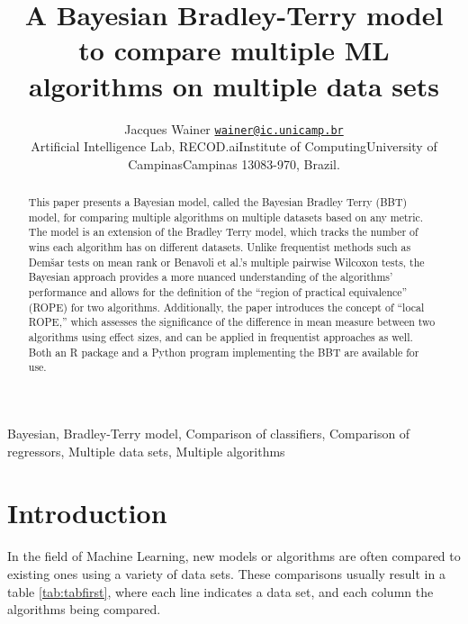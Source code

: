 \documentclass[twoside,11pt,preprint]{article}
\begin{document}
\title{A Bayesian Bradley-Terry model to compare multiple ML algorithms on multiple data sets}

\author{\name Jacques Wainer \email \href{mailto:wainer@ic.unicamp.br}{\nolinkurl{wainer@ic.unicamp.br}}\\
       \addr Artificial Intelligence Lab, RECOD.ai\newline Institute of Computing\newline University of Campinas\newline Campinas 13083-970, Brazil.
       }

\editor{}

\maketitle

\begin{abstract}%
This paper presents a Bayesian model, called the Bayesian Bradley Terry (BBT) model, for comparing multiple algorithms on multiple datasets based on any metric. The model is an extension of the Bradley Terry model, which tracks the number of wins each algorithm has on different datasets. Unlike frequentist methods such as Demšar tests on mean rank or Benavoli et al.'s multiple pairwise Wilcoxon tests, the Bayesian approach provides a more nuanced understanding of the algorithms' performance and allows for the definition of the ``region of practical equivalence'' (ROPE) for two algorithms.
Additionally, the paper introduces the concept of ``local ROPE,'' which assesses the significance of the difference in mean measure between two algorithms using effect sizes, and can be applied in frequentist approaches as well.
Both an R package and a Python program implementing the BBT are available for use.
\end{abstract}

\begin{keywords}
  Bayesian,
  Bradley-Terry model,
  Comparison of classifiers,
  Comparison of regressors,
  Multiple data sets,
  Multiple algorithms
\end{keywords}

\hypertarget{introduction}{%
\section{Introduction}\label{introduction}}

In the field of Machine Learning, new models or algorithms are often compared to existing ones using a variety of data sets. These comparisons usually result in a table \ref{tab:tabfirst}, where each line indicates a data set, and each column the algorithms being compared.
\end{document}
